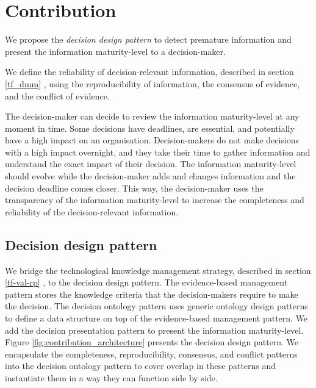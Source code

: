 \section{Contribution} \label{contribution}
We propose the \emph{decision design pattern} to detect premature information and present the information maturity-level to a decision-maker. 

\begin{center}
\large\color{document}{The decision design pattern detects incomplete and unreliable information and presents the information maturity-level to a decision-maker.}
\end{center}

We define the reliability of decision-relevant information, described in section \ref{tf_dmm} , using the reproducibility of information, the consensus of evidence, and the conflict of evidence. 

The decision-maker can decide to review the information maturity-level at any moment in time. Some decisions have deadlines, are essential, and potentially have a high impact on an organisation. Decision-makers do not make decisions with a high impact overnight, and they take their time to gather information and understand the exact impact of their decision. The information maturity-level should evolve while the decision-maker adds and changes information and the decision deadline comes closer. This way, the decision-maker uses the transparency of the information maturity-level to increase the completeness and reliability of the decision-relevant information.

\subsection{Decision design pattern}
We bridge the technological knowledge management strategy, described in section \ref{tf-val-rp} , to the decision design pattern. The evidence-based management pattern stores the knowledge criteria that the decision-makers require to make the decision. The decision ontology pattern uses generic ontology design patterns to define a data structure on top of the evidence-based management pattern. We add the decision presentation pattern to present the information maturity-level. Figure \ref{fig:contribution_architecture} presents the decision design pattern. We encapsulate the completeness, reproducibility, consensus, and conflict patterns into the decision ontology pattern to cover overlap in these patterns and instantiate them in a way they can function side by side.

